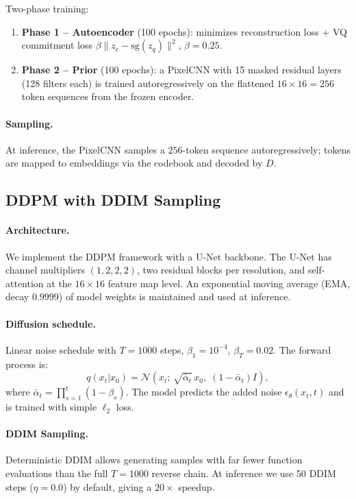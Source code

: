 \documentclass[12pt,a4paper]{article}
\begin{document}
Two-phase training:
\begin{enumerate}[noitemsep]
  \item \textbf{Phase 1 -- Autoencoder} (100 epochs): minimizes reconstruction
        loss + VQ commitment loss $\beta \|z_e - \text{sg}(z_q)\|^2$, $\beta=0.25$.
  \item \textbf{Phase 2 -- Prior} (100 epochs): a PixelCNN \cite{pixelcnn} with
        15 masked residual layers (128 filters each) is trained autoregressively
        on the flattened $16 \times 16 = 256$ token sequences from the frozen encoder.
\end{enumerate}

\paragraph{Sampling.}
At inference, the PixelCNN samples a $256$-token sequence autoregressively;
tokens are mapped to embeddings via the codebook and decoded by $D$.

\subsection{DDPM with DDIM Sampling}
\label{sec:ddpm}

\paragraph{Architecture.}
We implement the DDPM framework \cite{ddpm} with a U-Net backbone.  The U-Net
has channel multipliers $(1, 2, 2, 2)$, two residual blocks per resolution, and
self-attention at the $16\times16$ feature map level.  An exponential moving
average (EMA, decay $0.9999$) of model weights is maintained and used at
inference.

\paragraph{Diffusion schedule.}
Linear noise schedule with $T=1000$ steps, $\beta_1 = 10^{-4}$,
$\beta_T = 0.02$.  The forward process is:
\begin{equation}
  q(x_t | x_0) = \mathcal{N}(x_t;\, \sqrt{\bar\alpha_t}\, x_0,\;
                 (1 - \bar\alpha_t) I),
\end{equation}
where $\bar\alpha_t = \prod_{s=1}^t (1 - \beta_s)$.  The model predicts the
added noise $\epsilon_\theta(x_t, t)$ and is trained with simple $\ell_2$ loss.

\paragraph{DDIM Sampling.}
Deterministic DDIM \cite{ddim} allows generating samples with far fewer
function evaluations than the full $T=1000$ reverse chain.  At inference we
use 50 DDIM steps ($\eta = 0.0$) by default, giving a $20\times$ speedup.
\end{document}
